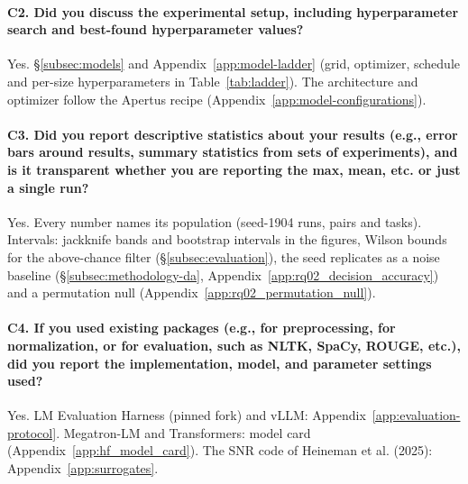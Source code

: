 \paragraph{C2. Did you discuss the experimental setup, including hyperparameter search and best-found hyperparameter values?}
Yes. \S\ref{subsec:models} and Appendix~\ref{app:model-ladder} (grid, optimizer, schedule and per-size hyperparameters in Table~\ref{tab:ladder}). The architecture and optimizer follow the Apertus recipe (Appendix~\ref{app:model-configurations}).

\paragraph{C3. Did you report descriptive statistics about your results (e.g., error bars around results, summary statistics from sets of experiments), and is it transparent whether you are reporting the max, mean, etc. or just a single run?}
Yes. Every number names its population (seed-1904 runs, pairs and tasks). Intervals: jackknife bands and bootstrap intervals in the figures, Wilson bounds for the above-chance filter (\S\ref{subsec:evaluation}), the seed replicates as a noise baseline (\S\ref{subsec:methodology-da}, Appendix~\ref{app:rq02_decision_accuracy}) and a permutation null (Appendix~\ref{app:rq02_permutation_null}).

\paragraph{C4. If you used existing packages (e.g., for preprocessing, for normalization, or for evaluation, such as NLTK, SpaCy, ROUGE, etc.), did you report the implementation, model, and parameter settings used?}
Yes. LM Evaluation Harness (pinned fork) and vLLM: Appendix~\ref{app:evaluation-protocol}. Megatron-LM and Transformers: model card (Appendix~\ref{app:hf_model_card}). The SNR code of Heineman et al. (2025): Appendix~\ref{app:surrogates}.

